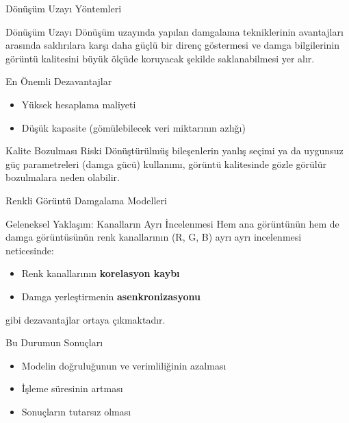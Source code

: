 \documentclass[aspectratio=169,xcolor={dvipsnames}]{beamer}
\begin{document}
\begin{frame}{Dönüşüm Uzayı Yöntemleri}

    \begin{block}{Dönüşüm Uzayı}
        Dönüşüm uzayında yapılan damgalama tekniklerinin avantajları arasında saldırılara karşı daha güçlü bir direnç göstermesi ve damga bilgilerinin görüntü kalitesini büyük ölçüde koruyacak şekilde saklanabilmesi yer alır. 
    \end{block}

    \begin{block}{En Önemli Dezavantajlar}
        \begin{itemize}
            \item Yüksek hesaplama maliyeti
            \item Düşük kapasite (gömülebilecek veri miktarının azlığı)
        \end{itemize}
    \end{block}
    
        
    \begin{block}{Kalite Bozulması Riski}
        Dönüştürülmüş bileşenlerin yanlış seçimi ya da uygunsuz güç parametreleri (damga gücü) kullanımı, görüntü kalitesinde gözle görülür bozulmalara neden olabilir.
    \end{block}
    
\end{frame}

\begin{frame}{Renkli Görüntü Damgalama Modelleri}
    \begin{block}{Geleneksel Yaklaşım: Kanalların Ayrı İncelenmesi}
        Hem ana görüntünün hem de damga görüntüsünün renk kanallarının (R, G, B) ayrı ayrı incelenmesi neticesinde:
        \begin{itemize}
            \item Renk kanallarının \textbf{korelasyon kaybı}
            \item Damga yerleştirmenin \textbf{asenkronizasyonu}
        \end{itemize}
        gibi dezavantajlar ortaya çıkmaktadır.
    \end{block}
    
    
    \begin{alertblock}{Bu Durumun Sonuçları}
        \begin{itemize}
            \item Modelin doğruluğunun ve verimliliğinin azalması
            \item İşleme süresinin artması
            \item Sonuçların tutarsız olması
        \end{itemize}
    \end{alertblock}
\end{frame}
\end{document}
